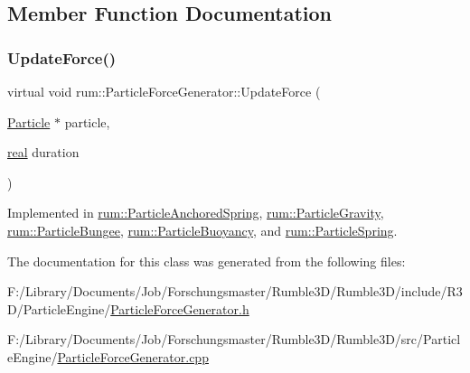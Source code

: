 \subsection{Member Function Documentation}
\mbox{\label{classrum_1_1_particle_force_generator_aca758295718deb8569796185ccbe8d54}} 
\subsubsection{\texorpdfstring{Update\+Force()}{UpdateForce()}}
{\footnotesize\ttfamily virtual void rum\+::\+Particle\+Force\+Generator\+::\+Update\+Force (\begin{DoxyParamCaption}\item[{\hyperlink{classrum_1_1_particle}{Particle} $\ast$}]{particle,  }\item[{\hyperlink{namespacerum_a7e8cca23573d5eaead0f138cbaa4862c}{real}}]{duration }\end{DoxyParamCaption})\hspace{0.3cm}{\ttfamily [pure virtual]}}



Implemented in \hyperlink{classrum_1_1_particle_anchored_spring_aa4fcab6f3de51c6b89f3a65b80814cc6}{rum\+::\+Particle\+Anchored\+Spring}, \hyperlink{classrum_1_1_particle_gravity_a8b943480e3856d1818e5090097403679}{rum\+::\+Particle\+Gravity}, \hyperlink{classrum_1_1_particle_bungee_a631e7f4c92c881b9a62471e2f75e2a2c}{rum\+::\+Particle\+Bungee}, \hyperlink{classrum_1_1_particle_buoyancy_aeda5d90f9ac512fdf63079739b9af0b7}{rum\+::\+Particle\+Buoyancy}, and \hyperlink{classrum_1_1_particle_spring_aed78e527b0a96a392fe5d9e1ffa50ca6}{rum\+::\+Particle\+Spring}.



The documentation for this class was generated from the following files\+:\begin{DoxyCompactItemize}
\item 
F\+:/\+Library/\+Documents/\+Job/\+Forschungsmaster/\+Rumble3\+D/\+Rumble3\+D/include/\+R3\+D/\+Particle\+Engine/\hyperlink{_particle_force_generator_8h}{Particle\+Force\+Generator.\+h}\item 
F\+:/\+Library/\+Documents/\+Job/\+Forschungsmaster/\+Rumble3\+D/\+Rumble3\+D/src/\+Particle\+Engine/\hyperlink{_particle_force_generator_8cpp}{Particle\+Force\+Generator.\+cpp}\end{DoxyCompactItemize}
